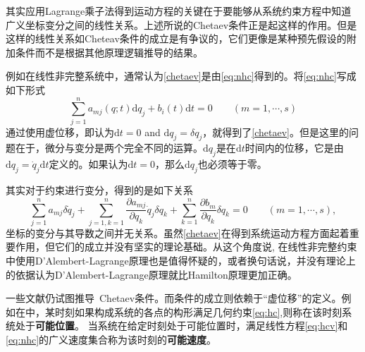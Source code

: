 \documentclass[a4paper,UTF8,11pt,hyperref]{ctexart}
\newcommand{\mathd}{\mathrm{d}}
\begin{document}
其实应用Lagrange乘子法得到运动方程的关键在于要能够从系统约束方程中知道广义坐标变分之间的线性关系。上述所说的Chetaev条件正是起这样的作用。但是这样的线性关系如Cheteav条件的成立是有争议的\supercite{guo1994}，它们更像是某种预先假设的附加条件而不是根据其他原理逻辑推导的结果。

例如在线性非完整系统中，通常认为\eqref{chetaev}是由\eqref{eq:nhc}得到的。将\eqref{eq:nhc}写成如下形式
\begin{equation}
  \sum_{j = 1}^n a_{m j} ( q ; t) \mathd q_j + b_i ( t) \mathd t= 0 \hspace{2em} ( m =
  1, \cdots, s)
\end{equation}
通过使用虚位移，即认为$\mathd t=0$ and $\mathd q_j = \delta q_j$，就得到了\eqref{chetaev}。但是这里的问题在于，微分与变分是两个完全不同的运算。$\mathd q_j$是在$\mathd t$时间内的位移，它是由$\mathd q_j=\dot{q}_j \mathd t$定义的。如果认为$\mathd t=0$，那么$\mathd q_j$也必须等于零。

其实对于约束进行变分，得到的是如下关系
\begin{equation}
  \sum_{j = 1}^n a_{m j}  \delta \dot{ q}_j +  \sum_{j = 1,k=1}^n \frac{\partial a_{m j} }{\partial q_k} \dot{ q}_j \delta q_k +\sum_{k=1}^n \frac{\partial b_m }{\partial q_k}\delta q_k = 0 \hspace{2em} ( m =
  1, \cdots, s),
\end{equation}
坐标的变分与其导数之间并无关系。虽然\eqref{chetaev}在得到系统运动方程方面起着重要作用，但它们的成立并没有坚实的理论基础。从这个角度说, 在线性非完整约束中使用D'Alembert-Lagrange原理也是值得怀疑的，或者换句话说，并没有理论上的依据认为D'Alembert-Lagrange原理就比Hamilton原理更加正确。

一些文献仍试图推导~Chetaev条件。而条件的成立则依赖于“虚位移”的定义。例如在\cite{markeyev}中，某时刻如果构成系统的各点的构形满足几何约束\eqref{eq:hc},则称在该时刻系统处于\textbf{可能位置}。
当系统在给定时刻处于可能位置时，满足线性方程\eqref{eq:hcv}和\eqref{eq:nhc}的广义速度集合称为该时刻的\textbf{可能速度}。
\end{document}
